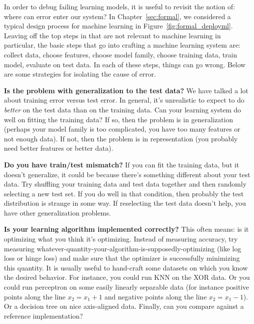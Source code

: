 In order to debug failing learning models, it is useful to revisit the notion of: where can error enter our system?
In Chapter~\ref{sec:formal}, we considered a typical design process for machine learning in Figure~\ref{fig:formal_deployml}.
Leaving off the top steps in that are not relevant to machine learning in particular, the basic steps that go into crafting a machine learning system are:
collect data, choose features, choose model family, choose training data, train model, evaluate on test data.
In each of these steps, things can go wrong.
Below are some strategies for isolating the cause of error.

\textbf{Is the problem with generalization to the test data?} We have talked a lot about training error versus test error. In general, it's unrealistic to expect to do \emph{better} on the test data than on the training data.
Can your learning system do well on fitting the training data? If so, then the problem is in generalization (perhaps your model family is too complicated, you have too many features or not enough data). If not, then the problem is in representation (you probably need better features or better data).

\textbf{Do you have train/test mismatch?} If you can fit the training data, but it doesn't generalize, it could be because there's something different about your test data. Try shuffling your training data and test data together and then randomly selecting a new test set. If you do well in that condition, then probably the test distribution is strange in some way. If reselecting the test data doesn't help, you have other generalization problems.

\textbf{Is your learning algorithm implemented correctly?} This often means: is it optimizing what you think it's optimizing. Instead of measuring accuracy, try measuring whatever-quantity-your-algorithm-is-supposedly-optimizing (like log loss or hinge loss) and make sure that the optimizer is successfully minimizing this quantity. It is usually useful to hand-craft some datasets on which you know the desired behavior. 
For instance, you could run KNN on the XOR data.  Or you
could run perceptron on some easily linearly separable data (for
instance positive points along the line $x_2 = x_1 + 1$ and negative
points along the line $x_2 = x_1 - 1$).  Or a decision tree on nice
axis-aligned data.
Finally, can you compare against a reference implementation?

